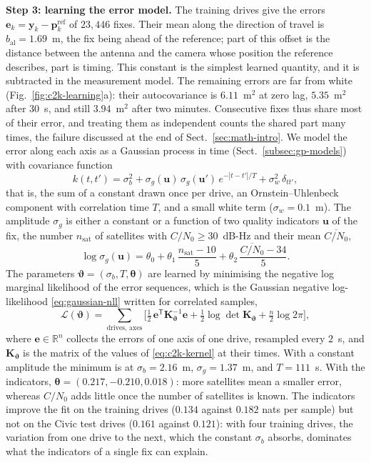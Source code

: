 \documentclass[graybox,envcountchap]{style/SNmono}
\begin{document}
\textbf{Step 3: learning the error model.} The training drives give the errors $\mathbf{e}_k=\mathbf{y}_k-\mathbf{p}^{\mathrm{ref}}_k$ of $23{,}446$ fixes. Their mean along the direction of travel is $b_{\mathrm{al}}=1.69$~m, the fix being ahead of the reference; part of this offset is the distance between the antenna and the camera whose position the reference describes, part is timing. This constant is the simplest learned quantity, and it is subtracted in the measurement model. The remaining errors are far from white (Fig.~\ref{fig:c2k-learning}a): their autocovariance is $6.11$~m$^{2}$ at zero lag, $5.35$~m$^{2}$ after $30$~s, and still $3.94$~m$^{2}$ after two minutes. Consecutive fixes thus share most of their error, and treating them as independent counts the shared part many times, the failure discussed at the end of Sect.~\ref{sec:math-intro}. We model the error along each axis as a Gaussian process in time (Sect.~\ref{subsec:gp-models}) with covariance function
\begin{equation}
k(t,t')=\sigma_b^{2}+\sigma_g(\mathbf{u})\,\sigma_g(\mathbf{u}')\,e^{-|t-t'|/T}+\sigma_w^{2}\,\delta_{tt'},
\label{eq:c2k-kernel}
\end{equation}
that is, the sum of a constant drawn once per drive, an Ornstein--Uhlenbeck component with correlation time $T$, and a small white term ($\sigma_w=0.1$~m). The amplitude $\sigma_g$ is either a constant or a function of two quality indicators $\mathbf{u}$ of the fix, the number $n_{\mathrm{sat}}$ of satellites with $C/N_0\ge30$~dB-Hz and their mean $\overline{C/N_0}$,
\begin{equation}
\log\sigma_g(\mathbf{u})=\theta_0+\theta_1\,\frac{n_{\mathrm{sat}}-10}{5}+\theta_2\,\frac{\overline{C/N_0}-34}{5}.
\label{eq:c2k-features}
\end{equation}
The parameters $\boldsymbol{\vartheta}=(\sigma_b,T,\boldsymbol{\theta})$ are learned by minimising the negative log marginal likelihood of the error sequences, which is the Gaussian negative log-likelihood \eqref{eq:gaussian-nll} written for correlated samples,
\begin{equation}
\mathcal{L}(\boldsymbol{\vartheta})=\sum_{\text{drives, axes}}\Big[\tfrac12\,\mathbf{e}^{\mathsf T}\mathbf{K}_{\boldsymbol{\vartheta}}^{-1}\mathbf{e}+\tfrac12\log\det\mathbf{K}_{\boldsymbol{\vartheta}}+\tfrac{n}{2}\log 2\pi\Big],
\label{eq:c2k-marginal}
\end{equation}
where $\mathbf{e}\in\mathbb{R}^{n}$ collects the errors of one axis of one drive, resampled every $2$~s, and $\mathbf{K}_{\boldsymbol{\vartheta}}$ is the matrix of the values of \eqref{eq:c2k-kernel} at their times. With a constant amplitude the minimum is at $\sigma_b=2.16$~m, $\sigma_g=1.37$~m, and $T=111$~s. With the indicators, $\boldsymbol{\theta}=(0.217,-0.210,0.018)$: more satellites mean a smaller error, whereas $C/N_0$ adds little once the number of satellites is known. The indicators improve the fit on the training drives ($0.134$ against $0.182$ nats per sample) but not on the Civic test drives ($0.161$ against $0.121$): with four training drives, the variation from one drive to the next, which the constant $\sigma_b$ absorbs, dominates what the indicators of a single fix can explain.
\end{document}
